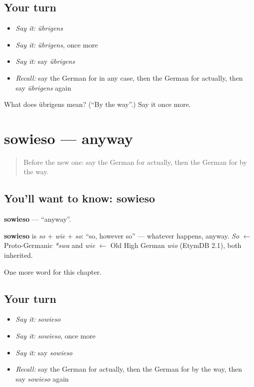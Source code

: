\subsection*{Your turn}
\begin{itemize}
\raggedright
  \item \emph{Say it:} \emph{übrigens}
  \item \emph{Say it:} \emph{übrigens}, once more
  \item \emph{Say it:} say \emph{übrigens}
  \item \emph{Recall:} say the German for in any case, then the German for actually, then say \emph{übrigens} again
\end{itemize}

\begin{tcolorbox}[breakable,colback=teal!4,colframe=teal!35!black,title={Before you move on}]
What does übrigens mean? (\textquotedblleft{}By the way\textquotedblright{}.) Say it once more.
\end{tcolorbox}
\section[sowieso]{sowieso — anyway}

\label{lesson:GE-C251-sowieso}



\begin{quote}
Before the new one: say the German for actually, then the German for by the way.
\end{quote}

\subsection*{You'll want to know: sowieso}
\textbf{sowieso} — \textquotedblleft{}anyway\textquotedblright{}.

\begin{cousinweb}
\textbf{sowieso} is \emph{so} + \emph{wie} + \emph{so}: \textquotedblleft{}so, however so\textquotedblright{} — whatever happens, anyway. \emph{So} $\leftarrow$ Proto-Germanic \emph{*swa} and \emph{wie} $\leftarrow$ Old High German \emph{wio} (EtymDB 2.1), both inherited.
\end{cousinweb}

\begin{grammarlens}[title={What you've built}]
One more word for this chapter.
\end{grammarlens}

\subsection*{Your turn}
\begin{itemize}
\raggedright
  \item \emph{Say it:} \emph{sowieso}
  \item \emph{Say it:} \emph{sowieso}, once more
  \item \emph{Say it:} say \emph{sowieso}
  \item \emph{Recall:} say the German for actually, then the German for by the way, then say \emph{sowieso} again
\end{itemize}

